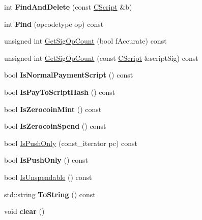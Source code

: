 \begin{DoxyCompactItemize}
\item 
\mbox{\label{class_c_script_aad6e9f84fe8aa2d27a979f1bc2732463}} 
int {\bfseries Find\+And\+Delete} (const \mbox{\hyperlink{class_c_script}{C\+Script}} \&b)
\item 
\mbox{\label{class_c_script_a89876c711ef226abd65088672cef6c2d}} 
int {\bfseries Find} (opcodetype op) const
\item 
unsigned int \mbox{\hyperlink{class_c_script_a957f92ddf3efcd76b66e514c05f27dde}{Get\+Sig\+Op\+Count}} (bool f\+Accurate) const
\item 
unsigned int \mbox{\hyperlink{class_c_script_ab2fc38465955bb6688d204036633ee85}{Get\+Sig\+Op\+Count}} (const \mbox{\hyperlink{class_c_script}{C\+Script}} \&script\+Sig) const
\item 
\mbox{\label{class_c_script_a4bebedf75cc256220cd7be25a6c95fe7}} 
bool {\bfseries Is\+Normal\+Payment\+Script} () const
\item 
\mbox{\label{class_c_script_a0c3729c606d318923dc06f95d85a0971}} 
bool {\bfseries Is\+Pay\+To\+Script\+Hash} () const
\item 
\mbox{\label{class_c_script_aadeaf93bd9c00abc9e20d082051adac8}} 
bool {\bfseries Is\+Zerocoin\+Mint} () const
\item 
\mbox{\label{class_c_script_a84914a83542deece42dda7b22b043c1f}} 
bool {\bfseries Is\+Zerocoin\+Spend} () const
\item 
bool \mbox{\hyperlink{class_c_script_a090905f875fa5a40e616b319de8e973f}{Is\+Push\+Only}} (const\+\_\+iterator pc) const
\item 
\mbox{\label{class_c_script_a804771eeafb1039672515eabbc823274}} 
bool {\bfseries Is\+Push\+Only} () const
\item 
bool \mbox{\hyperlink{class_c_script_a11c26ad1d03fa2d60a733337c21b6719}{Is\+Unspendable}} () const
\item 
\mbox{\label{class_c_script_a05fe53ab8fc6a217036bb0d6d7f5d706}} 
std\+::string {\bfseries To\+String} () const
\item 
\mbox{\label{class_c_script_a7b2baf842621f07c4939408acf63377c}} 
void {\bfseries clear} ()
\end{DoxyCompactItemize}
